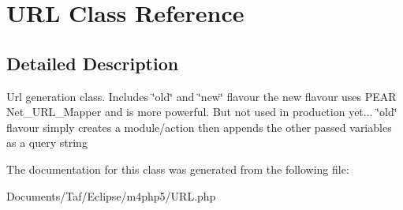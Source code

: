 \hypertarget{classURL}{
\section{URL Class Reference}
\label{classURL}
}


\subsection{Detailed Description}
Url generation class. Includes \char`\"{}old\char`\"{} and \char`\"{}new\char`\"{} flavour the new flavour uses PEAR Net\_\-URL\_\-Mapper and is more powerful. But not used in production yet... \char`\"{}old\char`\"{} flavour simply creates a module/action then appends the other passed variables as a query string 

The documentation for this class was generated from the following file:\begin{CompactItemize}
\item 
Documents/Taf/Eclipse/m4php5/URL.php\end{CompactItemize}
